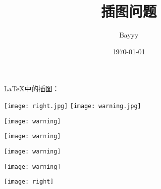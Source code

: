 \documentclass{ctexart}
\title{插图问题}
\author{Bayyy}
\date{\today}
\begin{document}
	\LaTeX{}中的插图：
	
	\texttt{[image: right.jpg]}
	\texttt{[image: warning.jpg]}
	
	\texttt{[image: warning]}	%
	
	\texttt{[image: warning]}	%
	
	\texttt{[image: warning]}
	
	\texttt{[image: warning]}
	
	\texttt{[image: right]}
\end{document}
